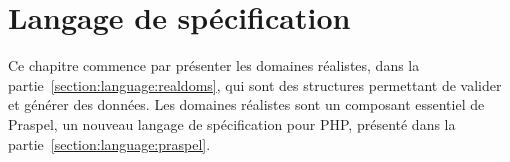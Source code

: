 \chapter{Langage de spécification}
\label{chapter:language}

\mminitoc

Ce chapitre commence par présenter les domaines réalistes, dans la
partie~\ref{section:language:realdoms}, qui sont des structures permettant de
valider et générer des données. Les domaines réalistes sont un composant
essentiel de Praspel, un nouveau langage de spécification pour PHP, présenté
dans la partie~\ref{section:language:praspel}.

